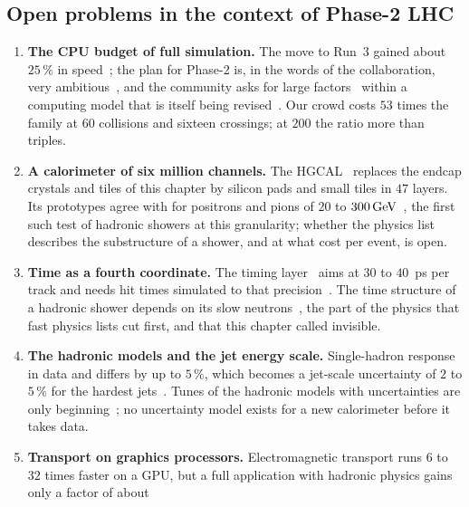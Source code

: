 \subsection*{Open problems in the context of Phase-2 LHC}
\label{sec:crowd_at_the_border:open_problems}
\begin{enumerate}
  \item \textbf{The CPU budget of full simulation.} The move to Run~3 gained
    about $25\,\%$ in speed~\cite{CMS:2021dly}; the plan for Phase-2 is, in
    the words of the collaboration, very ambitious~\cite{Srimanobhas:2024nmy,Srimanobhas:2025abv},
    and the community asks for large factors~\cite{HEPSoftwareFoundation:2018fmg,Apostolakis:2022nnf}
    within a computing model that is itself being
    revised~\cite{Perez-CaleroYzquierdo:2026dvu}. Our crowd costs $53$ times
    the family at $60$ collisions and sixteen crossings; at $200$ the ratio
    more than triples.
  \item \textbf{A calorimeter of six million channels.} The HGCAL~\cite{CMS:2017jpq}
    replaces the endcap crystals and tiles of this chapter by silicon pads
    and small tiles in $47$ layers. Its prototypes agree with \GEANT for
    positrons and pions of $20$ to $300\,\mathrm{GeV}$~\cite{CMSHGCAL:2021nyx,CMS:2022jvd},
    the first such test of hadronic showers at this granularity; whether the
    physics list describes the substructure of a shower, and at what cost
    per event, is open.
  \item \textbf{Time as a fourth coordinate.} The timing layer~\cite{Butler:2019rpu}
    aims at $30$ to $40$~ps per track and needs hit times simulated to that
    precision~\cite{Sorrentino:2023hjw}. The time structure of a hadronic
    shower depends on its slow neutrons~\cite{CALICE:2014tgv}, the part of
    the physics that fast physics lists cut first, and that this chapter
    called invisible.
  \item \textbf{The hadronic models and the jet energy scale.} Single-hadron
    response in data and \GEANT differs by up to $5\,\%$, which becomes a
    jet-scale uncertainty of $2$ to $5\,\%$ for the hardest
    jets~\cite{ATLAS:2016djy}. Tunes of the hadronic models with
    uncertainties are only beginning~\cite{Genser:2023fic}; no uncertainty
    model exists for a new calorimeter before it takes data.
  \item \textbf{Transport on graphics processors.} Electromagnetic
    transport runs $6$ to $32$ times faster on a GPU, but a full application
    with hadronic physics gains only a factor of about

\end{enumerate}
